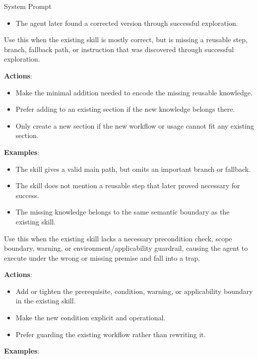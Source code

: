 \begin{svpromptbox}{System Prompt}
\begin{itemize}
\item The agent later found a corrected version through successful exploration.
\end{itemize}
\smallskip
{}
\smallskip
Use this when the existing skill is mostly correct, but is missing a reusable step, branch, fallback path, or instruction that was discovered through successful exploration.\par
\smallskip
\textbf{Actions}:\par
\smallskip
\begin{itemize}
\item Make the minimal addition needed to encode the missing reusable knowledge.
\item Prefer adding to an existing section if the new knowledge belongs there.
\item Only create a new section if the new workflow or usage cannot fit any existing section.
\end{itemize}
\smallskip
\textbf{Examples}:\par
\smallskip
\begin{itemize}
\item The skill gives a valid main path, but omits an important branch or fallback.
\item The skill does not mention a reusable step that later proved necessary for success.
\item The missing knowledge belongs to the same semantic boundary as the existing skill.
\end{itemize}
\smallskip
{}
\smallskip
Use this when the existing skill lacks a necessary precondition check, scope boundary, warning, or environment/applicability guardrail, causing the agent to execute under the wrong or missing premise and fall into a trap.\par
\smallskip
\textbf{Actions}:\par
\smallskip
\begin{itemize}
\item Add or tighten the prerequisite, condition, warning, or applicability boundary in the existing skill.
\item Make the new condition explicit and operational.
\item Prefer guarding the existing workflow rather than rewriting it.
\end{itemize}
\smallskip
\textbf{Examples}:\par
\smallskip
\begin{itemize}

\end{itemize}
\end{svpromptbox}
